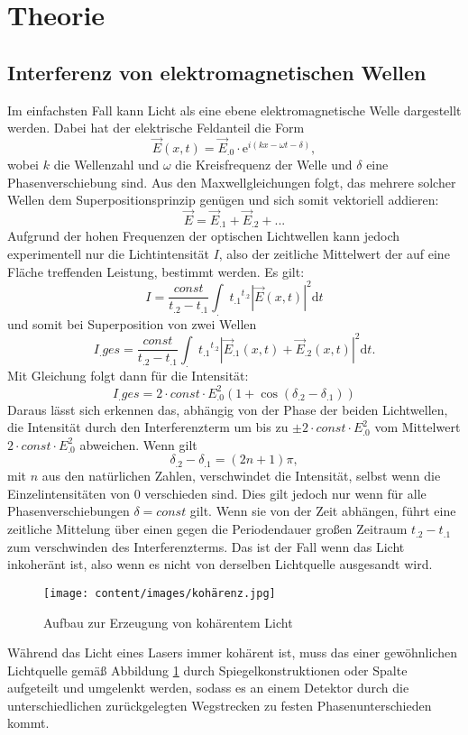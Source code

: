 \section{Theorie}
\label{sec:Theorie}

\subsection{Interferenz von elektromagnetischen Wellen}
Im einfachsten Fall kann Licht als eine ebene elektromagnetische Welle dargestellt werden. Dabei hat der elektrische Feldanteil die Form
\begin{equation}
\vec{E}(x,t)=\vec{E}_.0\cdot \mathrm{e}^{i\left(kx -\omega t -\delta\right)}\label{eq:Welle},
\end{equation}
wobei $k$ die Wellenzahl und $\omega$ die Kreisfrequenz der Welle und $\delta$ eine Phasenverschiebung sind.
Aus den Maxwellgleichungen folgt, das mehrere solcher Wellen dem Superpositionsprinzip genügen und sich somit vektoriell addieren:
\[
\vec{E}=\vec{E}_.1+\vec{E}_.2+\text{...}
\]
Aufgrund der hohen Frequenzen der optischen Lichtwellen kann jedoch experimentell nur die Lichtintensität $I$, also der zeitliche Mittelwert der auf eine Fläche treffenden Leistung, bestimmt werden.
Es gilt:
\[
I=\frac{const}{t_.2-t_.1}\int_.{t_.1}^{t_.2}|\vec{E}(x,t)|^2\mathrm{d}t
\]
und somit bei Superposition von zwei Wellen
\begin{equation}
I_.{ges}=\frac{const}{t_.2-t_.1}\int_.{t_.1}^{t_.2}|\vec{E}_.1(x,t)+\vec{E}_.2(x,t)|^2\mathrm{d}t \text{.}
\end{equation}
Mit Gleichung folgt dann für die Intensität:
\begin{equation}
I_.{ges}=2\cdot const\cdot E^2_.0(1+\cos(\delta_.2-\delta_.1))
\end{equation}
Daraus lässt sich erkennen das, abhängig von der Phase der beiden Lichtwellen, die Intensität durch den Interferenzterm um bis zu $\pm 2\cdot const\cdot E^2_.0$ vom Mittelwert $2\cdot const\cdot E^2_.0$ abweichen.
Wenn gilt
\[
\delta_.2-\delta_.1=(2n+1)\pi,
\]
mit $n$ aus den natürlichen Zahlen, verschwindet die Intensität, selbst wenn die Einzelintensitäten von $0$ verschieden sind.
Dies gilt jedoch nur wenn für alle Phasenverschiebungen $\delta=const$ gilt. Wenn sie von der Zeit abhängen, führt eine zeitliche Mittelung über einen gegen die Periodendauer großen Zeitraum $t_.2-t_.1$ zum verschwinden des Interferenzterms. Das ist der Fall wenn das Licht inkoheränt ist, also wenn es nicht von derselben Lichtquelle ausgesandt wird.\newline
\begin{figure}
\centering
\texttt{[image: content/images/kohärenz.jpg]}
\caption{Aufbau zur Erzeugung von kohärentem Licht\cite{V401}}
\label{fig:Kohärenz}
\end{figure}
Während das Licht eines Lasers immer kohärent ist, muss das einer gewöhnlichen Lichtquelle gemäß Abbildung \ref{fig:Kohärenz} durch Spiegelkonstruktionen oder Spalte aufgeteilt und umgelenkt werden, sodass es an einem Detektor durch die unterschiedlichen zurückgelegten Wegstrecken zu festen Phasenunterschieden kommt.
